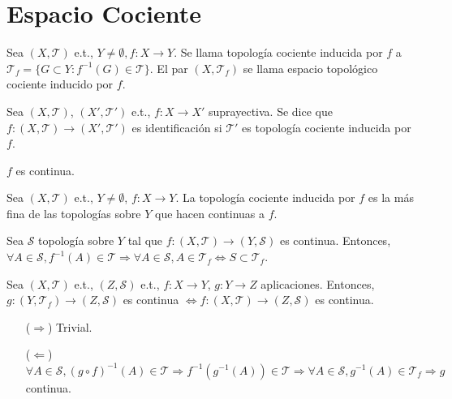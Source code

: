 \section{Espacio Cociente}

\begin{defn}
  Sea $( X, \mathcal{T} )$ e.t., $Y \neq \emptyset, f: X \to Y$. Se llama topología cociente inducida por $f $ a $\mathcal{T}_{f} = \{ G \subset Y : f^{-1}(G) \in \mathcal{T} \}$. El par $( X , \mathcal{T}_{f})$ se llama espacio topológico cociente inducido por $f$.
\end{defn}

\begin{defn}[Identificación]
  Sea $( X, \mathcal{T} )$, $( X', \mathcal{T}' )$ e.t., $f: X \to X'$ suprayectiva. Se dice que $f: ( X, \mathcal{T} ) \to ( X', \mathcal{T}' )$ es identificación si $\mathcal{T}'$ es topología cociente inducida por $f$.
\end{defn}

\begin{obs}
  $f$ es continua.
\end{obs}

\begin{prop}
  Sea $( X, \mathcal{T} )$ e.t., $Y \neq \emptyset$, $f: X \to Y$. La topología cociente inducida por $f$ es la más fina de las topologías sobre $Y$ que hacen continuas a $f$.
\end{prop}

\begin{dem}
  Sea $\mathcal{S}$ topología sobre $Y$ tal que $f: ( X, \mathcal{T} ) \to ( Y, \mathcal{S} )$ es continua. Entonces, $\forall A \in \mathcal{S}, f^{-1}(A) \in \mathcal{T} \Rightarrow \forall A \in \mathcal{S}, A \in \mathcal{T}_{f} \Leftrightarrow S \subset \mathcal{T}_{f}$.
\end{dem}

\begin{prop}
  Sea $( X, \mathcal{T} )$ e.t., $( Z, \mathcal{S} )$ e.t., $f: X \to Y$, $g: Y \to Z$ aplicaciones. Entonces, $g: (Y, \mathcal{T}_{f}) \to (Z,\mathcal{S})$ es continua $\Leftrightarrow f: (X, \mathcal{T}) \to (Z, \mathcal{S})$ es continua.
\end{prop}
 
\begin{dem}
  \begin{enumerate}[label=(\roman*)]
    \item [($\Rightarrow$)] Trivial.
    \item [($\Leftarrow$)] $\forall A \in \mathcal{S}, (g \circ f)^{-1}(A) \in \mathcal{T} \Rightarrow f^{-1}(g^{-1}(A)) \in \mathcal{T} \Rightarrow \forall A \in \mathcal{S}, g^{-1}(A) \in \mathcal{T}_{f} \Rightarrow g$ continua.
  \end{enumerate} 
\end{dem}

